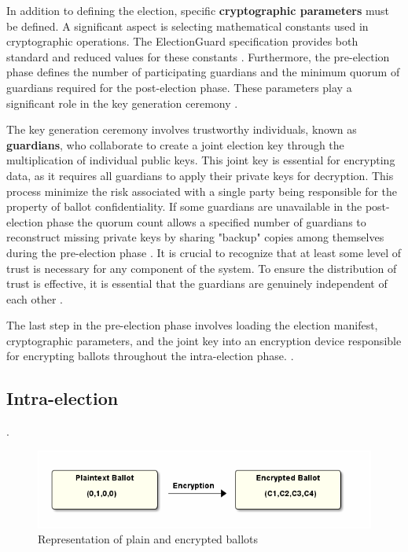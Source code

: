 In addition to defining the election, specific \textbf{cryptographic parameters} must be defined. A significant aspect is selecting mathematical constants used in cryptographic operations. The ElectionGuard specification provides both standard and reduced values for these constants \cite[21, 36-38]{eg-spec}. Furthermore, the pre-election phase defines the number of participating guardians and the minimum quorum of guardians required for the post-election phase. These parameters play a significant role in the key generation ceremony \cite[8-9]{eg-paper}.

The key generation ceremony involves trustworthy individuals, known as \textbf{guardians}, who collaborate to create a joint election key through the multiplication of individual public keys. This joint key is essential for encrypting data, as it requires all guardians to apply their private keys for decryption. This process minimize the risk associated with a single party being responsible for the property of ballot confidentiality. If some guardians are unavailable in the post-election phase the quorum count allows a specified number of guardians to reconstruct missing private keys by sharing "backup" copies among themselves during the pre-election phase \cite[8]{eg-paper}  \cite{eg-docs}. It is crucial to recognize that at least some level of trust is necessary for any component of the system. To ensure the distribution of trust is effective, it is essential that the guardians are genuinely independent of each other \cite[92]{stuve-study}.

The last step in the pre-election phase involves loading the election manifest, cryptographic parameters, and the joint key into an encryption device responsible for encrypting ballots throughout the intra-election phase. \cite[8]{eg-paper}.

\subsection{Intra-election}.
\begin{figure}
    \centering
    \includegraphics[scale=.5]{abbildungen/Diagramme/ballotencryption.png}
    \caption{Representation of plain and encrypted ballots} \label{Fig:ballot-representation}
\end{figure}


